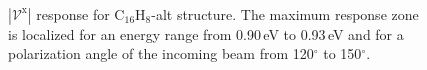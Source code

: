 \documentclass[prb,11pt,tightenlines,twocolumn,aps]{revtex4-1}
\begin{document}
\begin{figure}[tb]
    \centering
    \\
    \caption{$|\mathcal{V}^{\mathrm{x}}|$ response for C$_{16}$H$_{8}$-alt
    structure. The maximum response zone is localized for an energy range from
    0.90\,eV to 0.93\,eV and for a polarization angle of the
    incoming beam from 120$^{\circ}$ to 150$^{\circ}$.}
    \label{fig:alt-vab-mag}
\end{figure}
\end{document}
